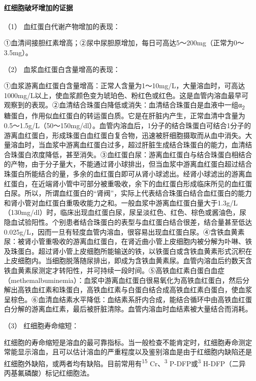 \paragraph{红细胞破坏增加的证据}

\hypertarget{text00126.htmlux5cux23CHP4-16-2-3-1-1}{}
（1） 血红蛋白代谢产物增加的表现：

①血清间接胆红素增高；②尿中尿胆原增加，每日可高达5～200mg（正常为0～3.5mg）。

\hypertarget{text00126.htmlux5cux23CHP4-16-2-3-1-2}{}
（2） 血浆血红蛋白含量增高的表现：

①血浆游离血红蛋白含量增高：正常人含量为1～10mg/L，大量溶血时，可高达1000mg/L以上，使血浆颜色变为琥珀色、粉红色或红色。这是血管内溶血最早可观察到的表现。②血清结合珠蛋白降低或消失：血清结合珠蛋白是血液中一组α\textsubscript{2}
糖蛋白，作用似血红蛋白的转运蛋白质。它是在肝脏内产生，正常血清中含量为0.5～1.5g/L（50～150mg/dl）。血管内溶血后，1分子的结合珠蛋白可结合1分子的游离血红蛋白，形成珠蛋白血红蛋白复合物，迅速被肝细胞摄取而从血中消失。大量溶血时，当血浆中游离血红蛋白过多，超过肝脏生成结合珠蛋白的能力，血清结合珠蛋白浓度降低，甚至消失。③血红蛋白尿：游离血红蛋白与结合珠蛋白相结合的产物，由于分子量大，不能通过肾小球排出，但当血浆中游离血红蛋白超过结合珠蛋白所能结合的量，多余的血红蛋白即可从肾小球滤出。经肾小球滤出的游离血红蛋白，在近端肾小管中可部分被重吸收，余下的血红蛋白形成临床所见的血红蛋白尿。所以，所谓血红蛋白的“肾阀”，实际上代表结合珠蛋白结合血红蛋白的能力和肾小管对血红蛋白重吸收能力之和。一般血浆中游离血红蛋白量大于1.3g/L（130mg/dl）时，临床出现血红蛋白尿，尿呈淡红色、红色、棕色或酱油色，尿隐血试验阳性。个别患者结合珠蛋白的表型与血红蛋白结合很差，结合量甚至低达0.025g/L，因而一旦有轻度血管内溶血，很容易出现血红蛋白尿。④含铁血黄素尿：被肾小管重吸收的游离血红蛋白，在肾近曲小管上皮细胞内被分解为卟啉、铁及珠蛋白。超过肾小管上皮细胞所能输送的铁，以铁蛋白或含铁血黄素形式沉积在上皮细胞内。当细胞脱落随尿排出，即成为含铁血黄素尿。血管内溶血后约数天含铁血黄素尿测定才转阳性，并可持续一段时间。⑤高铁血红素白蛋白血症（methemalbuminemia）：血浆中游离血红蛋白很易氧化为高铁血红蛋白，然后分解出高铁血红素和珠蛋白，高铁血红素与白蛋白结合成高铁血红素白蛋白，使血浆呈棕色。⑥血清血结素水平降低：血结素系肝内合成，能结合循环中由高铁血红蛋白分解的游离血红素，最后被肝脏清除。血管内溶血时血结素被大量结合而消耗。

\hypertarget{text00126.htmlux5cux23CHP4-16-2-3-1-3}{}
（3） 红细胞寿命缩短：

红细胞的寿命缩短是溶血的最可靠指标。当一般检查不能肯定时，红细胞寿命测定常能显示溶血，且可以估计溶血的严重程度以及鉴别溶血是由于红细胞内缺陷还是红细胞外缺陷，或两者均有缺陷。目前常用有\textsuperscript{15}
Cr、\textsuperscript{3} P-DFP或\textsuperscript{3}
H-DFP（二异丙基氟磷酸）标记红细胞法。

